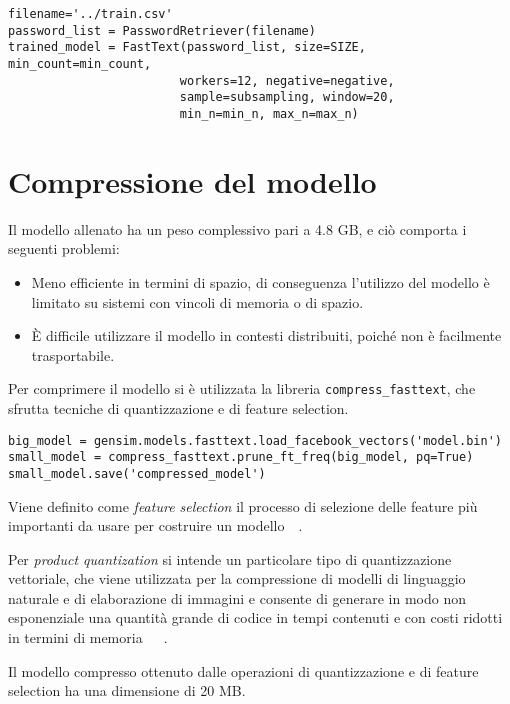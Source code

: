 \begin{verbatim}
filename='../train.csv'
password_list = PasswordRetriever(filename)
trained_model = FastText(password_list, size=SIZE, min_count=min_count,
                        workers=12, negative=negative,
                        sample=subsampling, window=20,
                        min_n=min_n, max_n=max_n)
\end{verbatim}

\section{Compressione del modello}
\label{sec:post-allenamento compressione modello}
Il modello allenato ha un peso complessivo pari a 4.8 GB, e ciò comporta i seguenti problemi:
\begin{itemize}
    \item Meno efficiente in termini di spazio, di conseguenza l'utilizzo del modello è limitato su sistemi con vincoli di memoria o di spazio.
    \item È difficile utilizzare il modello in contesti distribuiti, poiché non è facilmente trasportabile.
\end{itemize}
Per comprimere il modello si è utilizzata la libreria \texttt{compress\_fasttext}, che sfrutta tecniche di quantizzazione e di feature selection.~\cite{compress-fasttext}
\begin{verbatim}
big_model = gensim.models.fasttext.load_facebook_vectors('model.bin')
small_model = compress_fasttext.prune_ft_freq(big_model, pq=True)
small_model.save('compressed_model')
\end{verbatim}

Viene definito come \emph{feature selection} il processo di selezione delle feature più importanti da usare per costruire un modello~\cite{bishop2006pattern}~\cite{feature}.

Per \emph{product quantization} si intende un particolare tipo di quantizzazione vettoriale, che viene utilizzata per la compressione di modelli di linguaggio naturale e di elaborazione di immagini e consente di generare in modo non esponenziale una quantità grande di codice in tempi contenuti e con costi ridotti in termini di memoria~\cite{bijeeta}~\cite{compress-fasttext}~\cite{quantization}.

Il modello compresso ottenuto dalle operazioni di quantizzazione e di feature selection ha una dimensione di 20 MB.

